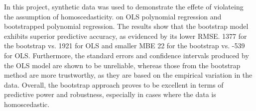 In this project, synthetic data was used to demonstrate the effete of violateing the assumption of homoscedasticity. on OLS polynomial regression and bootstrapped polynomial regression. The results show that the bootstrap model exhibits superior predictive accuracy, as evidenced by its lower RMSE. 1377 for the bootstrap vs. 1921 for OLS and smaller MBE 22 for the bootstrap vs. -539 for OLS. Furthermore, the standard errors and confidence intervals produced by the OLS model are shown to be unreliable, whereas those from the bootstrap method are more trustworthy, as they are based on the empirical variation in the data. Overall, the bootstrap approach proves to be excellent in terms of predictive power and robustness, especially in cases where the data is homoscedastic.